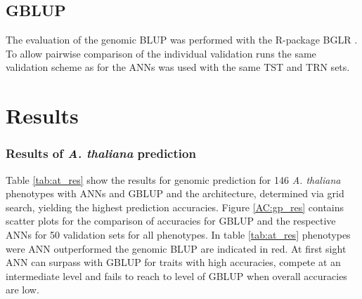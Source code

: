 \subsection{GBLUP}

The evaluation of the genomic BLUP was performed with the R-package BGLR \cite{BGLR}. To allow pairwise
comparison of the individual validation runs the same validation scheme as for the ANNs was used with the same
TST and TRN sets. 




\section{Results} \label{res:gp}
\subsubsection{Results of \textit{A. thaliana} prediction}
Table \ref{tab:at_res} show the results for genomic prediction for 146 \textit{A. thaliana} phenotypes with ANNs and GBLUP and the architecture, determined via grid search, yielding the highest prediction accuracies.
Figure \ref{AC:gp_res} contains scatter plots for the comparison of accuracies for GBLUP and the respective ANNs for 50 validation sets for all phenotypes.
In table \ref{tab:at_res} phenotypes were ANN outperformed the genomic BLUP are indicated in red. At first sight ANN can surpass with GBLUP for traits with high accuracies, compete at an intermediate level and fails to reach to level of GBLUP when overall accuracies are low. 


